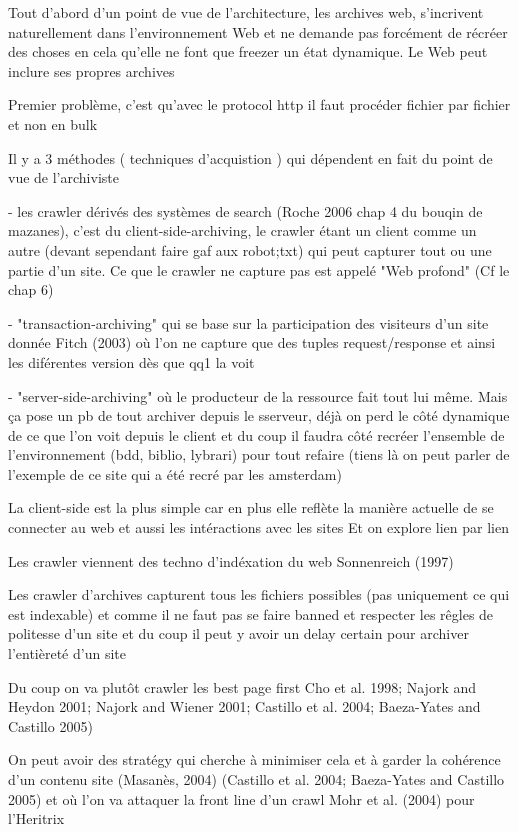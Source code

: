 \documentclass[symmetric,justified,marginals=raggedouter]{tufte-book}
\begin{document}
Tout d'abord d'un point de vue de l'architecture, les archives web, s'incrivent naturellement dans l'environnement Web et ne demande pas forcément de récréer des choses en cela qu'elle ne font que freezer un état dynamique. Le Web peut inclure ses propres archives 

Premier problème, c'est qu'avec le protocol http il faut procéder fichier par fichier et non en bulk

Il y a 3 méthodes ( techniques d'acquistion )  qui dépendent en fait du point de vue de l'archiviste 

- les crawler dérivés des systèmes de search (Roche 2006 chap 4 du bouqin de mazanes), c'est du client-side-archiving, le crawler étant un client comme un autre (devant sependant faire gaf aux robot;txt) qui peut capturer tout ou une partie d'un site. Ce que le crawler ne capture pas est appelé "Web profond" (Cf le chap 6)

- "transaction-archiving" qui se base sur la participation des visiteurs d'un site donnée Fitch (2003) où l'on ne capture que des tuples request/response et ainsi les diférentes version dès que qq1 la voit 

- "server-side-archiving" où le producteur de la ressource fait tout lui même. Mais ça pose un pb de tout archiver depuis le sserveur, déjà on perd le côté dynamique de ce que l'on voit depuis le client et du coup il faudra côté recréer l'ensemble de l'environnement (bdd, biblio, lybrari) pour tout refaire (tiens là on peut parler de l'exemple de ce site qui a été recré par les amsterdam)

La client-side est la plus simple car en plus elle reflète la manière actuelle de se connecter au web et aussi les intéractions avec les sites 
Et on explore lien par lien 

Les crawler viennent des techno d'indéxation du web Sonnenreich (1997)

Les crawler d'archives capturent tous les fichiers possibles (pas uniquement ce qui est indexable) et comme il ne faut pas se faire banned et respecter les rêgles de politesse d'un site et du coup il peut y avoir un delay certain pour archiver l'entièreté d'un site 

Du coup on va plutôt crawler les best page first Cho et al. 1998; Najork and Heydon 2001; Najork and Wiener 2001; Castillo et al. 2004; Baeza-Yates and Castillo 2005)

On peut avoir des stratégy qui cherche à minimiser cela et à garder la cohérence d'un contenu site (Masanès, 2004) (Castillo et al. 2004; Baeza-Yates and Castillo 2005) et où l'on va attaquer la front line d'un crawl Mohr et al. (2004) pour l'Heritrix
\end{document}
